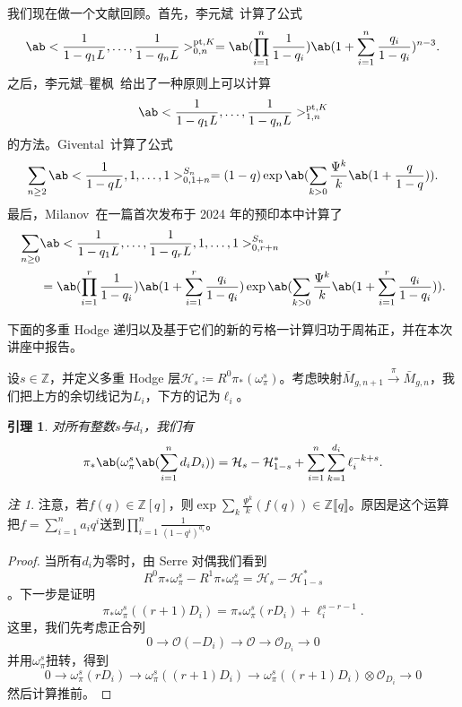 \documentclass{amsart}
\newtheorem{lem}[thm]{引理}
\theoremstyle{definition}
\theoremstyle{remark}
\newtheorem{rmk}[thm]{注}
\theoremstyle{plain}
\theoremstyle{definition}
\theoremstyle{remark}
\newcommand{\Z}{\mathbb{Z}}
\newcommand{\mc}[1]{\mathcal{#1}}
\newcommand{\mr}[1]{\mathrm{#1}}
\newcommand{\1}{\mathbf{1}}
\newcommand{\2}{\mathbf{2}}
\newcommand{\3}{\mathbf{3}}
\newcommand{\ps}[1]{\llbracket #1 \rrbracket}
\begin{document}
我们现在做一个文献回顾。首先，李元斌~\cite{Lee1997}计算了公式
\[ \ab<\frac{1}{1-q_1 L}, \ldots, \frac{1}{1-q_n L}>_{0,n}^{\mr{pt}, K} = \ab(\prod_{i=1}^n \frac{1}{1-q_i}) \ab(1 + \sum_{i=1}^n \frac{q_i}{1-q_i})^{n-3}. \]
之后，李元斌–瞿枫~\cite{LeeQu2014}给出了一种原则上可以计算
\[ \ab<\frac{1}{1-q_1 L}, \ldots, \frac{1}{1-q_n L}>_{1,n}^{\mr{pt}, K} \]
的方法。Givental~\cite{Givental2017K1}计算了公式
\[ \sum_{n \geq 2} \ab<\frac{1}{1-q L}, 1, \ldots, 1>_{0,1+n}^{S_n} = (1-q) \exp\ab(\sum_{k > 0} \frac{\Psi^k}{k} \ab(1 + \frac{q}{1-q})). \]
最后，Milanov~\cite{Milanov2025}在一篇首次发布于 2024 年的预印本中计算了
\begin{align*}
    \sum_{n \geq 0}& \ab<\frac{1}{1-q_1 L}, \ldots, \frac{1}{1-q_r L}, 1, \ldots, 1>_{0,r+n}^{S_n} \\
    &= \ab(\prod_{i=1}^{r} \frac{1}{1-q_i})\ab(1 + \sum_{i=1}^r \frac{q_i}{1-q_i}) \exp\ab(\sum_{k > 0} \frac{\Psi^k}{k} \ab(1 + \sum_{i=1}^r \frac{q_i}{1-q_i})). 
\end{align*}

下面的多重 Hodge 递归以及基于它们的新的亏格一计算归功于周祐正，并在本次讲座中报告。

设\(s \in \Z\)，并定义多重 Hodge 层\(\mc{H}_s \coloneqq R^0 \pi_* (\omega_{\pi}^s)\)。考虑映射\(\bar{M}_{g,n+1} \xrightarrow{\pi} \bar{M}_{g,n}\)，我们把上方的余切线记为\(L_i\)，下方的记为\(\ell_i\)。

\begin{lem}
    对所有整数\(s\)与\(d_i\)，我们有
    \[ \pi_*\ab(\omega_{\pi}^s\ab(\sum_{i=1}^n d_i D_i)) = \mc{H}_s-\mc{H}_{1-s}^* + \sum_{i=1}^n \sum_{k=1}^{d_i} \ell_i^{-k+s}. \]
\end{lem}

\begin{rmk}
    注意，若\(f(q) \in \Z[q]\)，则\(\exp \sum_k \frac{\Psi^k}{k} (f(q)) \in \Z \ps{q}\)。原因是这个运算把\(f = \sum_{i=1}^{n} a_i q^i\)送到\(\prod_{i=1}^n \frac{1}{(1-q^i)^{a_i}}\)。
\end{rmk}

\begin{proof}
    当所有\(d_i\)为零时，由 Serre 对偶我们看到
    \[ R^0 \pi_* \omega_{\pi}^s - R^1 \pi_* \omega_{\pi}^s = \mc{H}_s - \mc{H}_{1-s}^* \]
    。下一步是证明
    \[ \pi_* \omega_{\pi}^s ((r+1)D_i) = \pi_* \omega_{\pi}^s(r D_i) + \ell_i^{s-r-1}. \]
    这里，我们先考虑正合列
    \[ 0 \to \mc{O} (-D_i) \to \mc{O} \to \mc{O}_{D_i} \to 0 \]
    并用\(\omega_{\pi}^s\)扭转，得到
    \[ 0 \to \omega_{\pi}^s(r D_i) \to \omega_{\pi}^s ((r+1)D_i) \to \omega_{\pi}^s ((r+1)D_i) \otimes \mc{O}_{D_i} \to 0 \]
    然后计算推前。
\end{proof}
\end{document}
